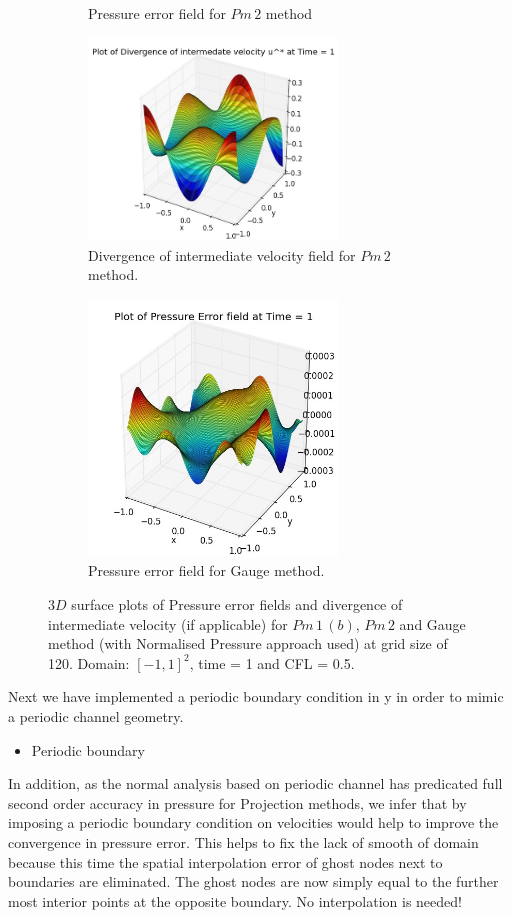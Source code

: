 \begin{figure}[H]
\begin{subfigure}[t]{2.5in}
		\caption{Pressure error field for $Pm\,2$ method}\label{fig:6.19c}		
	\end{subfigure}
	\quad
	\begin{subfigure}[t]{2.6in}
		\centering
		\includegraphics[width=2.6in]{figures/Pm2_pf2_cN_np_div_uvstar_t_1_grid_120.jpg}
		\caption{Divergence of intermediate velocity field for $Pm\,2$ method.}\label{fig:6.19d}
	\end{subfigure}
	\quad
	\begin{subfigure}[t]{2.6in}
		\centering
		\includegraphics[width=2.6in]{figures/Gauge_pf2_P_error_t_1_grid_120.jpg}
		\caption{Pressure error field for Gauge method. }\label{fig:6.19d}
	\end{subfigure}
	\caption{$3D$ surface plots of Pressure error fields and divergence of intermediate velocity (if applicable) for $Pm\,1\,(b)$, $Pm\,2$ and Gauge method (with Normalised Pressure approach used) at grid size of 120. Domain: $[-1,1]^2$, time = 1 and CFL = 0.5. }\label{fig:6.16}
\end{figure}

Next we have implemented a periodic boundary condition in y in order to mimic a periodic channel geometry.

\begin{itemize}
\item Periodic boundary
\end{itemize}
In addition, as the normal analysis based on periodic channel has predicated full second order accuracy in pressure for Projection methods, we infer that by imposing a periodic boundary condition on velocities would help to improve the convergence in pressure error. This helps to fix the lack of smooth of domain because this time the spatial interpolation error of ghost nodes next to boundaries are eliminated. The ghost nodes are now simply equal to the further most interior points at the opposite boundary. No interpolation is needed!\\

